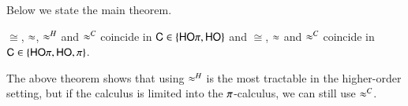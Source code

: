 \smallskip 

\noi Below we state the main theorem.

\smallskip 

\begin{theorem}[Coincidence]\rm
	\label{the:coincidence}
$\cong$, $\approx$, $\approx^H$ and $\approx^C$ coincide in $\mathsf{C}\in \{\mathsf{HO}\pi, \mathsf{HO}\}$
and 
$\cong$, $\approx$ and $\approx^C$ coincide in $\mathsf{C}\in \{\mathsf{HO}\pi, \mathsf{HO}, \pi\}$. 
\end{theorem}

\smallskip 

\noi The above theorem shows that using $\approx^H$ is the most tractable 
in the higher-order setting, but if the calculus is limited into the 
$\pi$-calculus, we can still use $\approx^C$. 


\smallskip 












